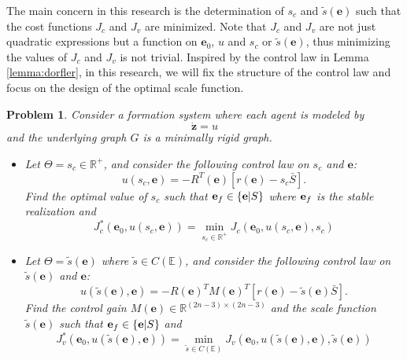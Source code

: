 \documentclass[times]{rncauth}
\newcommand{\be}{\ensuremath \mathbf{e}}
\newtheorem{prob}{Problem}[section]
\begin{document}
The main concern in this research is the determination of $s_c$ and
$\tilde{s}(\mathbf{e})$  such that the cost functions $J_c$ and $J_v$
are minimized. Note that $J_c$ and $J_v$ are not just quadratic
expressions but a function on $\mathbf{e}_0$, $u$ and $s_c$ or
$\tilde{s}(\mathbf{e})$, thus minimizing the values of $J_c$ and
$J_v$ is not trivial. Inspired by the control law in Lemma
\ref{lemma:dorfler}, in this research, we will fix the structure of
the control law and focus on the design of the optimal scale
function.
\begin{prob}\label{prob:general}
  Consider a formation system where each agent is modeled by
\begin{equation}\label{eq:basic_sys}
  \dot{\mathbf{z}}=u
\end{equation}
and the underlying graph $G$ is a minimally rigid graph.
\begin{itemize}
\item Let $\Theta=s_c\in \mathbb{R}^+$, and consider the following control law on   $s_c$ and $\mathbf{e}$:
\begin{equation}\label{eq:myde_eqS}
u(s_c,\mathbf{e})=-R^T(\mathbf{e})[r(\mathbf{e})-s_c\bar{S}].
\end{equation}
Find the optimal value of $s_c$ such that $\be_f\in\{\be|S\}$ where
$\be_f$ is the stable realization and
\begin{equation}\label{eq:jc0}
J_c^*(\mathbf{e}_0,u(s_c,\mathbf{e}))=\min\limits _{s_c\in
\mathbb{R}^+} J_c(\mathbf{e}_0,u(s_c,\mathbf{e}),s_c)
\end{equation}
\item Let $\Theta=\tilde{s}(\mathbf{e})$ where $\tilde{s}\in C(\mathbb{E})$, and consider the following control
law on  $\tilde{s}(\mathbf{e})$ and $\mathbf{e}$:
\begin{equation}\label{eq:u_varying}
  u(\tilde{s}(\mathbf{e}),\mathbf{e})=-R(\mathbf{e})^T M(\mathbf{e})^T
  [r(\mathbf{e})-\tilde{s}(\mathbf{e})\bar{S}].
\end{equation}
Find the control gain $M(\mathbf{e})\in\mathbb{R}^{(2n-3)\times
(2n-3)}$ and the scale function $\tilde{s}(\mathbf{e})$ such that
$\be_f\in\{\be|S\}$ and
\begin{equation}\label{eq:jv0}
J_v^*(\mathbf{e}_0,u(\tilde{s}(\mathbf{e}),\mathbf{e}))=\min\limits
_{\tilde{s}\in C(\mathbb{E})}
J_v(\mathbf{e}_0,u(\tilde{s}(\mathbf{e}),\mathbf{e}),\tilde{s}(\mathbf{e}))
\end{equation}
\end{itemize}
\end{prob}
\end{document}
